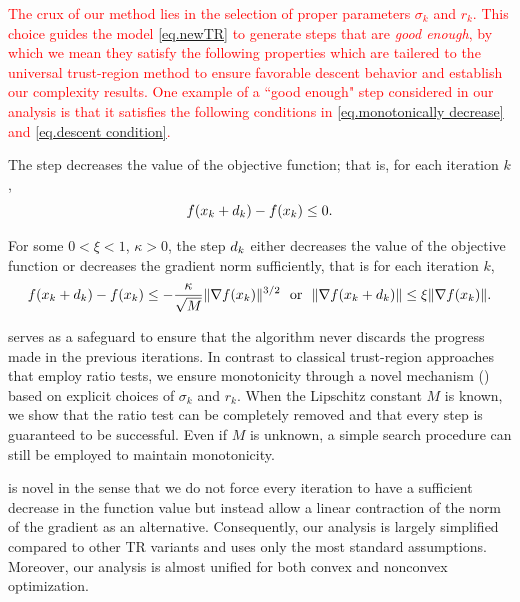 \textcolor{red}{
The crux of our method lies in the selection of proper parameters $\sigma_k$ and $r_k$. This choice guides the model \eqref{eq.newTR} to generate steps that are \textit{good enough}, by which we mean they satisfy the following properties which are tailered to the universal trust-region method to ensure favorable descent behavior and establish our complexity results. One example of a ``good enough" step considered in our analysis is that it satisfies the following conditions in \eqref{eq.monotonically decrease} and \eqref{eq.descent condition}.}
\begin{property}
    \label{cond.monotone}
    The step decreases the value of the objective function; that is,
    for each iteration $k$,
    \begin{equation}
        \label{eq.monotonically decrease}
        f(x_k+d_k)-f(x_k)\leq 0.
    \end{equation}
\end{property}
\begin{property}\label{cond.function or gradient}
    For some $0<\xi<1$, $\kappa>0$, the step $d_k$ either decreases the value of the objective function or decreases the gradient norm sufficiently, that is for each iteration $k$,
    \begin{equation}
        \label{eq.descent condition}
        f(x_k+d_k)-f(x_k)\leq -\frac{\kappa}{\sqrt{M}} \|\nabla f(x_k)\|^{3/2} \  \text{ or } \ \|\nabla f(x_k+d_k)\|\leq \xi\|\nabla f(x_k)\|.
    \end{equation}
\end{property}
 serves as a safeguard to ensure that the algorithm never discards the progress made in the previous iterations. In contrast to classical trust-region approaches that employ ratio tests, we ensure monotonicity through a novel mechanism () based on explicit choices of $\sigma_k$ and $r_k$. When the Lipschitz constant $M$ is known, we show that the ratio test can be completely removed and that every step is guaranteed to be successful. Even if $M$ is unknown, a simple search procedure can still be employed to maintain monotonicity.

 is novel in the sense that we do not force every iteration to have a sufficient decrease in the function value but instead allow a linear contraction of the norm of the gradient as an alternative. Consequently, our analysis is largely simplified compared to other TR variants and uses only the most standard assumptions. Moreover, our analysis is almost unified for both convex and nonconvex optimization.



